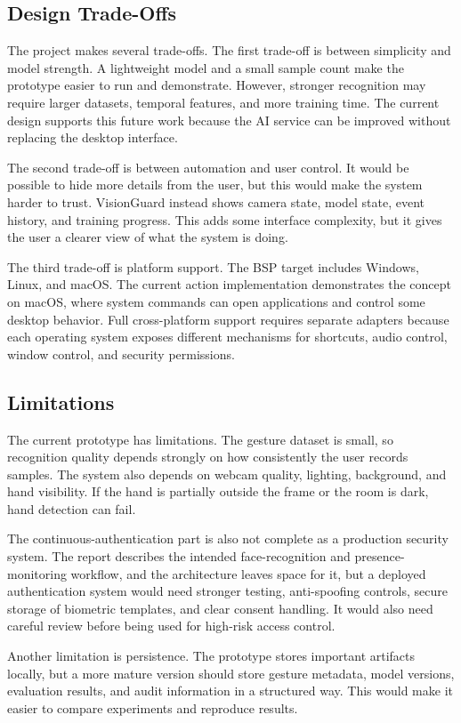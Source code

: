 \documentclass[10pt,twocolumn]{article}
\begin{document}
\subsection{Design Trade-Offs}
The project makes several trade-offs.
The first trade-off is between simplicity and model strength.
A lightweight model and a small sample count make the prototype easier to run and demonstrate.
However, stronger recognition may require larger datasets, temporal features, and more training time.
The current design supports this future work because the AI service can be improved without replacing the desktop interface.

The second trade-off is between automation and user control.
It would be possible to hide more details from the user, but this would make the system harder to trust.
VisionGuard instead shows camera state, model state, event history, and training progress.
This adds some interface complexity, but it gives the user a clearer view of what the system is doing.

The third trade-off is platform support.
The BSP target includes Windows, Linux, and macOS.
The current action implementation demonstrates the concept on macOS, where system commands can open applications and control some desktop behavior.
Full cross-platform support requires separate adapters because each operating system exposes different mechanisms for shortcuts, audio control, window control, and security permissions.

\subsection{Limitations}
The current prototype has limitations.
The gesture dataset is small, so recognition quality depends strongly on how consistently the user records samples.
The system also depends on webcam quality, lighting, background, and hand visibility.
If the hand is partially outside the frame or the room is dark, hand detection can fail.

The continuous-authentication part is also not complete as a production security system.
The report describes the intended face-recognition and presence-monitoring workflow, and the architecture leaves space for it, but a deployed authentication system would need stronger testing, anti-spoofing controls, secure storage of biometric templates, and clear consent handling.
It would also need careful review before being used for high-risk access control.

Another limitation is persistence.
The prototype stores important artifacts locally, but a more mature version should store gesture metadata, model versions, evaluation results, and audit information in a structured way.
This would make it easier to compare experiments and reproduce results.
\end{document}

